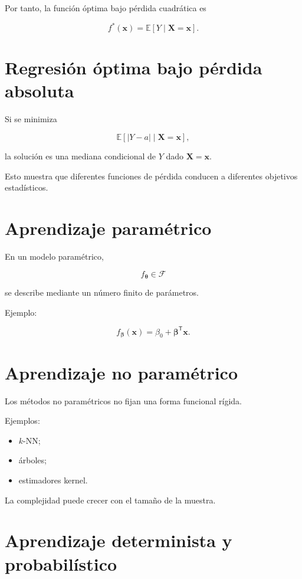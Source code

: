 \documentclass[
  spanish,
  11pt,
  letterpaper,
  DIV=11,
  numbers=noendperiod]{scrreprt}
\providecommand{\tightlist}{%
  \setlength{\itemsep}{0pt}\setlength{\parskip}{0pt}}
\theoremstyle{definition}
\theoremstyle{plain}
\theoremstyle{definition}
\theoremstyle{remark}
\begin{document}
Por tanto, la función óptima bajo pérdida cuadrática es

\[
f^{*}(\mathbf{x})
=
\mathbb{E}
[
Y\mid\mathbf{X}=\mathbf{x}
].
\]

\section{Regresión óptima bajo pérdida
absoluta}\label{regresiuxf3n-uxf3ptima-bajo-puxe9rdida-absoluta}

Si se minimiza

\[
\mathbb{E}
\left[
|Y-a|
\mid
\mathbf{X}=\mathbf{x}
\right],
\]

la solución es una mediana condicional de \(Y\) dado
\(\mathbf{X}=\mathbf{x}\).

Esto muestra que diferentes funciones de pérdida conducen a diferentes
objetivos estadísticos.

\section{Aprendizaje paramétrico}\label{aprendizaje-paramuxe9trico}

En un modelo paramétrico,

\[
f_{\boldsymbol{\theta}}
\in\mathcal{F}
\]

se describe mediante un número finito de parámetros.

Ejemplo:

\[
f_{\boldsymbol{\beta}}(\mathbf{x})
=
\beta_0
+
\boldsymbol{\beta}^{\mathsf T}\mathbf{x}.
\]

\section{Aprendizaje no
paramétrico}\label{aprendizaje-no-paramuxe9trico}

Los métodos no paramétricos no fijan una forma funcional rígida.

Ejemplos:

\begin{itemize}
\tightlist
\item
  \(k\)-NN;
\item
  árboles;
\item
  estimadores kernel.
\end{itemize}

La complejidad puede crecer con el tamaño de la muestra.

\section{Aprendizaje determinista y
probabilístico}\label{aprendizaje-determinista-y-probabiluxedstico}
\end{document}
